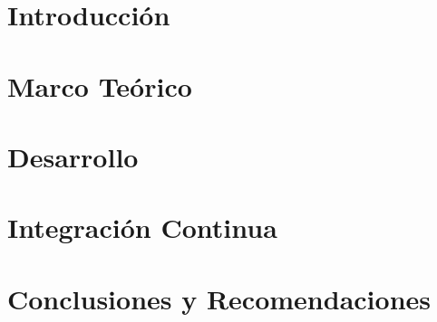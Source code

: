 \documentclass{report}
\begin{document}
  

  

  \chapter{Introducción}
  

  \chapter{Marco Teórico}
  

  \chapter{Desarrollo}
  

  \chapter{Integración Continua}
  

  \chapter{Conclusiones y Recomendaciones}
  
\end{document}
